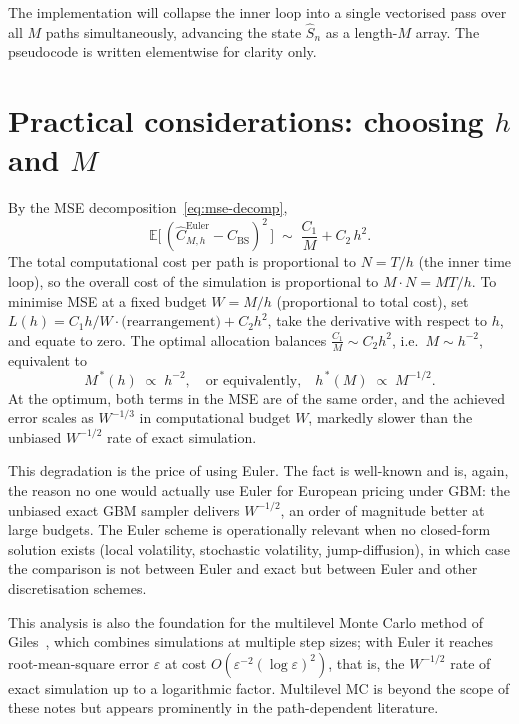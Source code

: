 \documentclass[11pt,a4paper]{article}
\theoremstyle{plain}
\theoremstyle{definition}
\theoremstyle{remark}
\newcommand{\E}{\mathbb{E}}
\begin{document}
The implementation will collapse the inner loop into a single
vectorised pass over all $M$ paths simultaneously, advancing the
state $\hat S_n$ as a length-$M$ array. The pseudocode is written
elementwise for clarity only.

\section{Practical considerations: choosing $h$ and $M$}
\label{sec:practical}

By the MSE decomposition~\eqref{eq:mse-decomp},
\begin{equation}
\E\big[\,(\hat C_{M, h}^{\mathrm{Euler}} - C_{\mathrm{BS}})^2\,\big]
\;\sim\; \frac{C_1}{M} + C_2\, h^2.
\end{equation}
The total computational cost per path is proportional to $N = T/h$
(the inner time loop), so the overall cost of the simulation is
proportional to $M \cdot N = M T / h$. To minimise MSE at a fixed
budget $W = M / h$ (proportional to total cost), set $L(h) = C_1 h /
W \cdot \text{(rearrangement)} + C_2 h^2$, take the derivative with
respect to $h$, and equate to zero. The optimal allocation balances
$\frac{C_1}{M} \sim C_2 h^2$, i.e.\ $M \sim h^{-2}$, equivalent to
\begin{equation}
\label{eq:optimal-allocation}
M^{\,*}(h) \;\propto\; h^{-2},
\quad \text{or equivalently,} \quad
h^{\,*}(M) \;\propto\; M^{-1/2}.
\end{equation}
At the optimum, both terms in the MSE are of the same order, and
the achieved error scales as $W^{-1/3}$ in computational budget $W$,
markedly slower than the unbiased $W^{-1/2}$ rate of exact simulation.

This degradation is the price of using Euler. The fact is well-known
and is, again, the reason no one would actually use Euler for
European pricing under GBM: the unbiased exact GBM sampler
delivers $W^{-1/2}$, an order of magnitude better at large budgets.
The Euler scheme is operationally relevant when no closed-form
solution exists (local volatility, stochastic volatility,
jump-diffusion), in which case the comparison is not between Euler
and exact but between Euler and other discretisation schemes.

This analysis is also the foundation for the multilevel Monte Carlo
method of Giles~\cite{Giles2008}, which combines simulations at
multiple step sizes; with Euler it reaches root-mean-square error
$\varepsilon$ at cost $O(\varepsilon^{-2} (\log \varepsilon)^2)$, that
is, the $W^{-1/2}$ rate of exact simulation up to a logarithmic factor.
Multilevel MC is beyond the scope of these notes but appears prominently
in the path-dependent literature.
\end{document}
